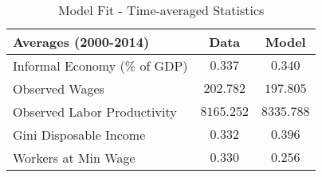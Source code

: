 \documentclass[12pt]{article}
\begin{document}
 \begin{table}[h]
 \caption{Model Fit - Time-averaged Statistics}
 \begin{center}
 \label{results1}
 \begin{tabular}{lcc}
  \hline
  \textbf{Averages} (2000-2014) & \textbf{Data} & \textbf{Model} \\ \hline
  Informal Economy (\% of GDP) &  $0.337$ & $0.340$  \\ 
  Observed Wages              &  $202.782$ & $197.805$  \\ 
  Observed Labor Productivity &  $8165.252$ & $8335.788$  \\ 
  Gini Disposable Income      &  $0.332$ & $0.396$  \\ 
  Workers at Min Wage         &  $0.330$ & $0.256$  \\ 
 \hline
 \end{tabular}
 \end{center}
 \end{table}
 
\end{document}
